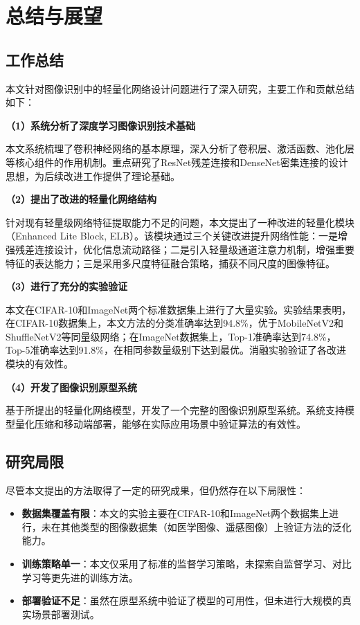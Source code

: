 \chapter{总结与展望}

\section{工作总结}

本文针对图像识别中的轻量化网络设计问题进行了深入研究，主要工作和贡献总结如下：

\textbf{（1）系统分析了深度学习图像识别技术基础}

本文系统梳理了卷积神经网络的基本原理，深入分析了卷积层、激活函数、池化层等核心组件的作用机制。重点研究了ResNet残差连接和DenseNet密集连接的设计思想，为后续改进工作提供了理论基础。

\textbf{（2）提出了改进的轻量化网络结构}

针对现有轻量级网络特征提取能力不足的问题，本文提出了一种改进的轻量化模块（Enhanced Lite Block, ELB）。该模块通过三个关键改进提升网络性能：一是增强残差连接设计，优化信息流动路径；二是引入轻量级通道注意力机制，增强重要特征的表达能力；三是采用多尺度特征融合策略，捕获不同尺度的图像特征。

\textbf{（3）进行了充分的实验验证}

本文在CIFAR-10和ImageNet两个标准数据集上进行了大量实验。实验结果表明，在CIFAR-10数据集上，本文方法的分类准确率达到94.8\%，优于MobileNetV2和ShuffleNetV2等同量级网络；在ImageNet数据集上，Top-1准确率达到74.8\%，Top-5准确率达到91.8\%，在相同参数量级别下达到最优。消融实验验证了各改进模块的有效性。

\textbf{（4）开发了图像识别原型系统}

基于所提出的轻量化网络模型，开发了一个完整的图像识别原型系统。系统支持模型量化压缩和移动端部署，能够在实际应用场景中验证算法的有效性。

\section{研究局限}

尽管本文提出的方法取得了一定的研究成果，但仍然存在以下局限性：

\begin{itemize}
    \item \textbf{数据集覆盖有限}：本文的实验主要在CIFAR-10和ImageNet两个数据集上进行，未在其他类型的图像数据集（如医学图像、遥感图像）上验证方法的泛化能力。
    \item \textbf{训练策略单一}：本文仅采用了标准的监督学习策略，未探索自监督学习、对比学习等更先进的训练方法。
    \item \textbf{部署验证不足}：虽然在原型系统中验证了模型的可用性，但未进行大规模的真实场景部署测试。
\end{itemize}

